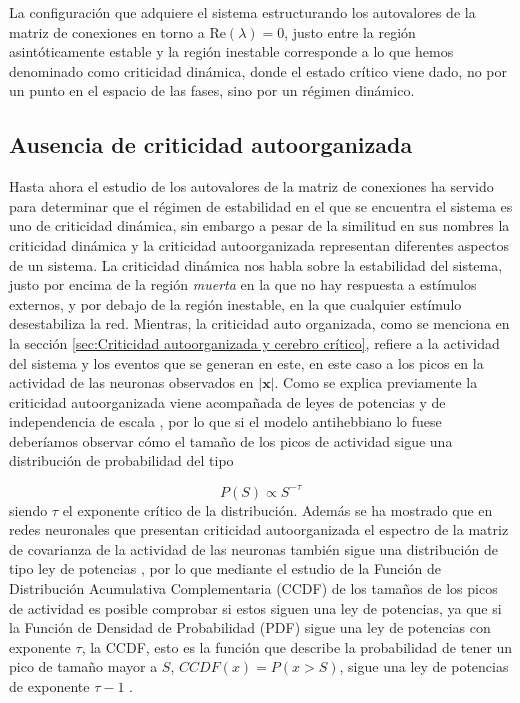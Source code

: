 \documentclass[11pt,a4paper,twoside,pdf]{article}
\numberwithin{equation}{section}
\newcommand{\re}{\text{Re}}
\begin{document}
La configuración que adquiere el sistema estructurando los autovalores de la matriz de conexiones en torno a \(\re(\lambda) = 0\), justo entre la región asintóticamente estable y la región inestable corresponde a lo que hemos denominado como criticidad dinámica, donde el estado crítico viene dado, no por un punto en el espacio de las fases, sino por un régimen dinámico.

\subsection{Ausencia de criticidad autoorganizada}
Hasta ahora el estudio de los autovalores de la matriz de conexiones ha servido para determinar que el régimen de estabilidad en el que se encuentra el sistema es uno de criticidad dinámica, sin embargo a pesar de la similitud en sus nombres la criticidad dinámica y la criticidad autoorganizada representan diferentes aspectos de un sistema. La criticidad dinámica nos habla sobre la estabilidad del sistema, justo por encima de la región \emph{muerta} en la que no hay respuesta a estímulos externos, y por debajo de la región inestable, en la que cualquier estímulo desestabiliza la red. Mientras, la criticidad auto organizada, como se menciona en la sección \ref{sec:Criticidad autoorganizada y cerebro crítico}, refiere a la actividad del sistema y los eventos que se generan en este, en este caso a los picos en la actividad de las neuronas observados en \(|\mathbf{x}|\). Como se explica previamente la criticidad autoorganizada viene acompañada de leyes de potencias y de independencia de escala \parencite{bak1987} \parencite{beggs2003}, por lo que si el modelo antihebbiano lo fuese deberíamos observar cómo el tamaño de los picos de actividad sigue una distribución de probabilidad del tipo

\begin{equation}
  P(S) \propto S^{-\tau}
\end{equation}
siendo \(\tau\) el exponente crítico de la distribución. Además se ha mostrado que en redes neuronales que presentan criticidad autoorganizada el espectro de la matriz de covarianza de la actividad de las neuronas también sigue una distribución de tipo ley de potencias \parencite{stringer2019}, por lo que mediante el estudio de la Función de Distribución Acumulativa Complementaria (CCDF) de los tamaños de los picos de actividad es posible comprobar si estos siguen una ley de potencias, ya que si la Función de Densidad de Probabilidad (PDF) sigue una ley de potencias con exponente \(\tau\), la CCDF, esto es la función que describe la probabilidad de tener un pico de tamaño mayor a \(S\), \(CCDF(x) = P(x > S)\), sigue una ley de potencias de exponente \(\tau -1\) \parencite{clauset2009}.
\end{document}
